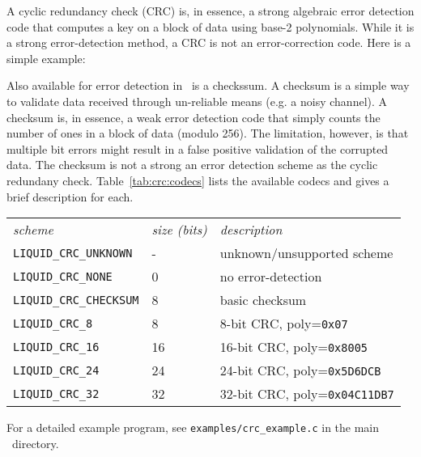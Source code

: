 A cyclic redundancy check (CRC) is, in essence, a strong algebraic error
detection code that computes a key on a block of data using base-2
polynomials.
While it is a strong error-detection method, a CRC is not an error-correction
code.
Here is a simple example:
%

%
Also available for error detection in \liquid\ is a checkssum.
A checksum is a simple way to validate data received through un-reliable means
(e.g. a noisy channel).
A checksum is, in essence, a weak error detection code that simply counts the
number of ones in a block of data (modulo 256).
The limitation, however, is that multiple bit errors might result in a false
positive validation of the corrupted data.
The checksum is not a strong an error detection scheme as the cyclic
redundany check.
%
Table~\ref{tab:crc:codecs} lists the available codecs and gives a brief
description for each.
%
\begin{table*}
\caption{Error-detection codecs available in \liquid}
\label{tab:crc:codecs}
\centering
{\small
\begin{tabular*}{0.85\textwidth}{l@{\extracolsep{\fill}}ll}
\toprule
{\it scheme} &
{\it size (bits)} &
{\it description}\\\otoprule
%
{\tt LIQUID\_CRC\_UNKNOWN}      & -     & unknown/unsupported scheme\\
{\tt LIQUID\_CRC\_NONE}         & 0     & no error-detection\\
{\tt LIQUID\_CRC\_CHECKSUM}     & 8     & basic checksum\\
{\tt LIQUID\_CRC\_8}            & 8     &  8-bit CRC, poly={\tt 0x07}\\
{\tt LIQUID\_CRC\_16}           & 16    & 16-bit CRC, poly={\tt 0x8005}\\
{\tt LIQUID\_CRC\_24}           & 24    & 24-bit CRC, poly={\tt 0x5D6DCB}\\
{\tt LIQUID\_CRC\_32}           & 32    & 32-bit CRC, poly={\tt 0x04C11DB7}\\\bottomrule

\end{tabular*}
}
\end{table*}%
%
For a detailed example program, see {\tt examples/crc\_example.c} in the
main \liquid\ directory.


